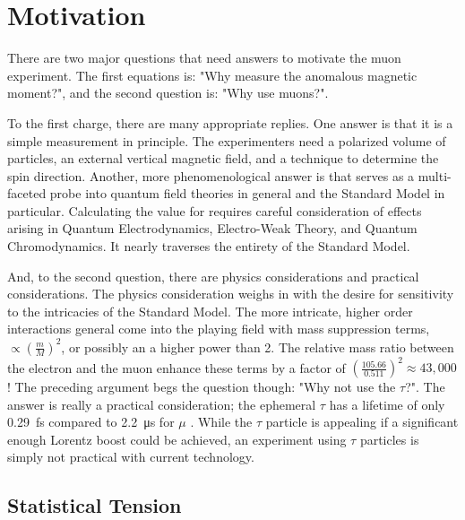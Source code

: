 \section{Motivation}

There are two major questions that need answers to motivate the muon \gmtwo experiment.  The first equations is: "Why measure the anomalous magnetic moment?", and the second question is: "Why use muons?".

To the first charge, there are many appropriate replies.  One answer is that it is a simple measurement in principle.  The experimenters need a polarized volume of particles, an external vertical magnetic field, and a technique to determine the spin direction. Another, more phenomenological answer is that \gmtwo serves as a multi-faceted probe into quantum field theories in general and the Standard Model in particular.  Calculating the value for \gmtwo requires careful consideration of effects arising in Quantum Electrodynamics, Electro-Weak Theory, and Quantum Chromodynamics.  It nearly traverses the entirety of the Standard Model.

And, to the second question, there are physics considerations and practical considerations.  The physics consideration weighs in with the desire for sensitivity to the intricacies of the Standard Model.  The more intricate, higher order interactions general come into the playing field with mass suppression terms, $\propto (\frac{m}{M})^2$, or possibly an a higher power than 2.  The relative mass ratio between the electron and the muon enhance these terms by a factor of $(\frac{105.66}{0.511})^2 \approx 43,000$ \cite{the-muon-g-2}!  The preceding argument begs the question though: "Why not use the $\tau$?".  The answer is really a practical consideration; the ephemeral $\tau$ has a lifetime of only \SI{0.29}{\femto\second} compared to \SI{2.2}{\micro\second} for $\mu$ \cite{codata}.  While the $\tau$ particle is appealing if a significant enough Lorentz boost could be achieved, an experiment using $\tau$ particles is simply not practical with current technology.

\subsection{Statistical Tension}

